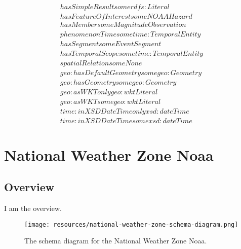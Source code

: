 \begin{align}
  hasSimpleResult some rdfs:Literal \\
  hasFeatureOfInterest some NOAAHazard \\
  hasMember some MagnitudeObservation \\
  phenomenonTime some time:TemporalEntity \\
  hasSegment some EventSegment \\
  hasTemporalScope some time:TemporalEntity \\
  spatialRelation some None \\
  geo:hasDefaultGeometry some geo:Geometry \\
  geo:hasGeometry some geo:Geometry \\
  geo:asWKT only geo:wktLiteral \\
  geo:asWKT some geo:wktLiteral \\
  time:inXSDDateTime only xsd:dateTime \\
  time:inXSDDateTime some xsd:dateTime \end{align}



\section{National Weather Zone Noaa}
\label{sec:national-weather-zone-noaa}
\subsection{Overview}
\label{ssec:overview}

I am the overview.

\begin{figure}[h!]
  \begin{center}
    \texttt{[image: resources/national-weather-zone-schema-diagram.png]}
  \end{center}
  \caption{The schema diagram for the National Weather Zone Noaa.}
  \label{fig:ov-diagram}
\end{figure}


